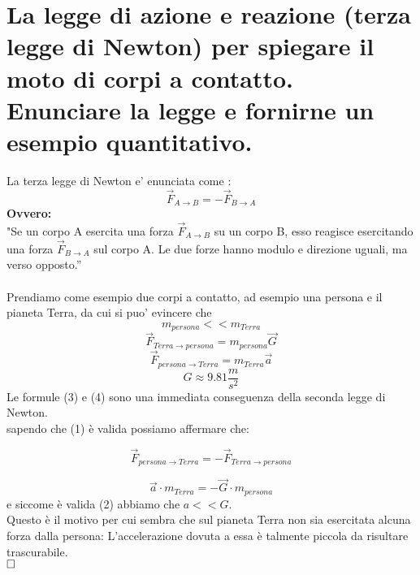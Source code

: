 \section{La legge di azione e reazione (terza legge di Newton)
    	per spiegare il moto di corpi a contatto. Enunciare la legge e
    	fornirne un esempio quantitativo.}
    La terza legge di Newton e' enunciata come :
    \begin{equation}
        \vec{F}_{A \rightarrow B} = - \vec{F}_{B \rightarrow A}
    \end{equation}
    \textbf{Ovvero:} \\
    "Se un corpo A esercita	una	forza $\vec{F}_{A \rightarrow B}$ su un corpo B, esso reagisce esercitando una forza $\vec{F}_{B \rightarrow A}$ sul corpo A. Le due forze hanno modulo e direzione uguali, ma verso opposto.”\\
	\\
	Prendiamo come esempio due corpi a contatto, ad esempio una persona e il pianeta Terra, da cui si puo' evincere che
	\begin{equation}
	    m_{persona} << m_{Terra} 
	\end{equation}
	\begin{equation}
	    \vec{F}_{Terra \rightarrow persona} = m_{persona} \vec{G}
	\end{equation}
	\begin{equation}
	    \vec{F}_{persona \rightarrow Terra} = m_{Terra} \vec{a} 
	\end{equation}
    $$ G \approx 9.81 \frac{m}{s^2} $$
	Le formule (3) e (4) sono una immediata conseguenza della seconda legge di Newton.\\
	sapendo che (1) \`e valida possiamo affermare che:

	$$ \vec{F}_{persona \rightarrow Terra} = -\vec{F}_{Terra \rightarrow persona} $$

	$$ \vec{a} \cdot m_{Terra} = -\vec{G} \cdot m_{persona} $$
	e siccome \`e valida (2) abbiamo che $a << G$. \\
	Questo \`e il motivo per cui sembra che sul pianeta Terra non sia esercitata alcuna forza dalla persona: L'accelerazione dovuta a essa \`e talmente piccola da risultare trascurabile.\\
	
	$\hfill\square$ %